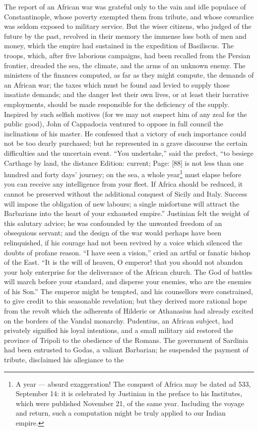 The report of an African war was grateful only to the vain and idle populace of Constantinople, whose poverty exempted them from tribute, and whose cowardice was seldom exposed to military service. But the wiser citizens, who judged of the future by the past, revolved in their memory the immense loss both of men and money, which the empire had sustained in the expedition of Basiliscus. The troops, which, after five laborious campaigns, had been recalled from the Persian frontier, dreaded the sea, the climate, and the arms of an unknown enemy. The ministers of the finances computed, as far as they might compute, the demands of an African war; the taxes which must be found and levied to supply those insatiate demands; and the danger lest their own lives, or at least their lucrative employments, should be made responsible for the deficiency of the supply. Inspired by such selfish motives (for we may not suspect him of any zeal for the public good), John of Cappadocia ventured to oppose in full council the inclinations of his master. He confessed that a victory of such importance could not be too dearly purchased; but he represented in a grave discourse the certain difficulties and the uncertain event. \texthebrew{“}You undertake,\texthebrew{}” said the prefect, \texthebrew{“}to besiege Carthage by land, the distance Edition: current; Page: [88] is not less than one hundred and forty days\texthebrew{}’ journey; on the sea, a whole year\footnote{A year \texthebrew{—} absurd exaggeration! The conquest of Africa may be dated ad 533, September 14: it is celebrated by Justinian in the preface to his Institutes, which were published November 21, of the same year. Including the voyage and return, such a computation might be truly applied to our Indian empire.} must elapse before you can receive any intelligence from your fleet. If Africa should be reduced, it cannot be preserved without the additional conquest of Sicily and Italy. Success will impose the obligation of new labours; a single misfortune will attract the Barbarians into the heart of your exhausted empire.\texthebrew{}” Justinian felt the weight of this salutary advice; he was confounded by the unwonted freedom of an obsequious servant; and the design of the war would perhaps have been relinquished, if his courage had not been revived by a voice which silenced the doubts of profane reason. \texthebrew{“}I have seen a vision,\texthebrew{}” cried an artful or fanatic bishop of the East. \texthebrew{“}It is the will of heaven, O emperor! that you should not abandon your holy enterprise for the deliverance of the African church. The God of battles will march before your standard, and disperse your enemies, who are the enemies of his Son.\texthebrew{}” The emperor might be tempted, and his counsellors were constrained, to give credit to this seasonable revelation; but they derived more rational hope from the revolt which the adherents of Hilderic or Athanasius had already excited on the borders of the Vandal monarchy. Pudentius, an African subject, had privately signified his loyal intentions, and a small military aid restored the province of Tripoli to the obedience of the Romans. The government of Sardinia had been entrusted to Godas, a valiant Barbarian; he suspended the payment of tribute, disclaimed his allegiance to the 